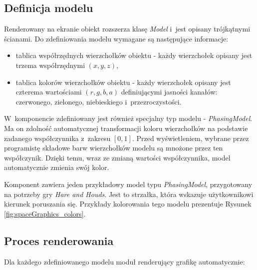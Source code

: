 \documentclass[a4paper,twocolumn,11pt]{article}
\begin{document}
\subsection{Definicja modelu}
 Renderowany na ekranie obiekt rozszerza klasę \emph{Model} i~jest opisany trójkątnymi ścianami.
 Do zdefiniowania modelu wymagane są następujące informacje:

 \begin{itemize}
  \item tablica współrzędnych wierzchołków obiektu - każdy wierzchołek opisany jest trzema współrzędnymi $(x, y, z)$,
  \item tablica kolorów wierzchołków obiektu - każdy wierzchołek opisany jest czterema wartościami $(r, g, b, a)$ definiującymi jasności kanałów: czerwonego, zielonego, niebieskiego i~przezroczystości.
 \end{itemize}

 W~komponencie zdefiniowany jest również specjalny typ modelu - \emph{PhasingModel}.
 Ma on zdolność automatycznej transformacji koloru wierzchołków na podstawie zadanego współczynnika z~zakresu $[0, 1]$.
 Przed wyświetleniem, wybrane przez programistę składowe barw wierzchołków modelu są mnożone przez ten współczynik.
 Dzięki temu, wraz ze zmianą wartości współczynnika, model automatycznie zmienia swój kolor.

 Komponent zawiera jeden przykładowy model typu \emph{PhasingModel}, przygotowany na potrzeby gry \emph{Hare and Houds}.
 Jest to strzałka, która wskazuje użytkownikowi kierunek poruszania się.
 Przykłady kolorowania tego modelu prezentuje Rysunek \ref{fig:spaceGraphics_colors}.

% 
 
\subsection{Proces renderowania}
 Dla każdego zdefiniowanego modelu moduł renderujący grafikę automatycznie:
\end{document}
